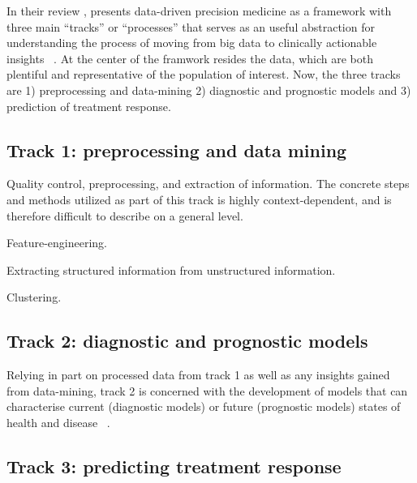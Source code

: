 In their review 
, 
\citeauthor{konigWhat2017} presents data-driven precision medicine
as a framework with three main \enquote{tracks} or \enquote{processes}
that serves as an useful abstraction for understanding
the process of moving from big data
to clinically actionable insights~%
\autocite{konigWhat2017}. 
At the center of the framwork resides the data,
which are both plentiful and representative of the population of interest.
Now, the three tracks are
1) preprocessing and data-mining
2) diagnostic and prognostic models
and 3) prediction of treatment response.

\subsection{Track 1: preprocessing and data mining}

Quality control, preprocessing, and extraction of information.
The concrete steps and methods utilized as part of this track
is highly context-dependent, 
and is therefore difficult to describe on a general level. 

Feature-engineering.

Extracting structured information from unstructured information.

Clustering.

\subsection{Track 2: diagnostic and prognostic models}

Relying in part on processed data from track 1
as well as any insights gained from data-mining,
track 2 is concerned with the development
of models that can characterise current (diagnostic models)
or future (prognostic models) states of health and disease~%
\autocite{konigWhat2017}. 

\subsection{Track 3: predicting treatment response}


